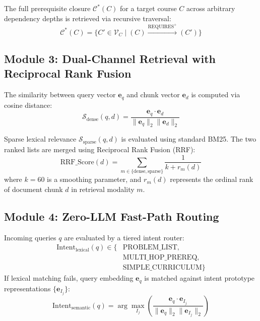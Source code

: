 \documentclass[conference]{IEEEtran}
\begin{document}
The full prerequisite closure $\mathcal{C}^*(C)$ for a target course $C$ across arbitrary dependency depths is retrieved via recursive traversal:
\begin{equation}
\mathcal{C}^*(C) = \{ C' \in \mathcal{V}_C \mid (C) \xrightarrow{\text{REQUIRES}^+} (C') \}
\end{equation}

\subsection{Module 3: Dual-Channel Retrieval with Reciprocal Rank Fusion}
The similarity between query vector $\mathbf{e}_q$ and chunk vector $\mathbf{e}_d$ is computed via cosine distance:
\begin{equation}
\mathcal{S}_{\text{dense}}(q, d) = \frac{\mathbf{e}_q \cdot \mathbf{e}_d}{\|\mathbf{e}_q\|_2 \|\mathbf{e}_d\|_2}
\end{equation}

Sparse lexical relevance $\mathcal{S}_{\text{sparse}}(q, d)$ is evaluated using standard BM25. The two ranked lists are merged using Reciprocal Rank Fusion (RRF):
\begin{equation}
\text{RRF\_Score}(d) = \sum_{m \in \{\text{dense}, \text{sparse}\}} \frac{1}{k + r_m(d)}
\end{equation}
where $k = 60$ is a smoothing parameter, and $r_m(d)$ represents the ordinal rank of document chunk $d$ in retrieval modality $m$.

\subsection{Module 4: Zero-LLM Fast-Path Routing}
Incoming queries $q$ are evaluated by a tiered intent router:
\begin{equation}
\begin{split}
\text{Intent}_{\text{lexical}}(q) \in \{ & \text{PROBLEM\_LIST}, \\
& \text{MULTI\_HOP\_PREREQ}, \\
& \text{SIMPLE\_CURRICULUM} \}
\end{split}
\end{equation}
If lexical matching fails, query embedding $\mathbf{e}_q$ is matched against intent prototype representations $\{\mathbf{e}_{I_j}\}$:
\begin{equation}
\text{Intent}_{\text{semantic}}(q) = \arg\max_{I_j} \left( \frac{\mathbf{e}_q \cdot \mathbf{e}_{I_j}}{\|\mathbf{e}_q\|_2 \|\mathbf{e}_{I_j}\|_2} \right)
\end{equation}
\end{document}
